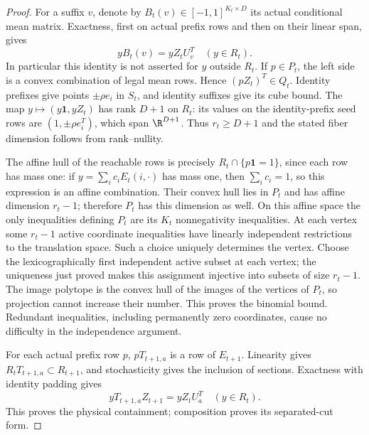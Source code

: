\begin{proof}
For a suffix $v$, denote by $B_t(v)\in[-1,1]^{K_t\times D}$ its
actual conditional mean matrix. Exactness, first on actual prefix rows
and then on their linear span, gives
\begin{equation}\label{eq:span51}
 yB_t(v)=yZ_tU_v^T\quad(y\in R_t).
\end{equation}
In particular this identity is not asserted for $y$ outside $R_t$.
If $p\in P_t$, the left side is a convex combination of legal mean
rows. Hence $(pZ_t)^T\in Q_t$. Identity prefixes give points
$\pm\rho e_i$ in $S_t$, and identity suffixes give its cube bound.
The map $y\mapsto(y\mathbf1,yZ_t)$ has rank $D+1$ on $R_t$:
its values on the identity-prefix seed rows are $(1,\pm\rho e_i^T)$,
which span $\R^{D+1}$. Thus $r_t\ge D+1$ and the stated fiber
dimension follows from rank--nullity.

The affine hull of the reachable rows is precisely
$R_t\cap\{p\mathbf1=1\}$, since each row has mass one: if $y=\sum_i c_iE_t(i,\cdot)$ has
mass one, then $\sum_i c_i=1$, so this expression is an affine combination.
Their convex hull lies in $P_t$ and has affine dimension $r_t-1$;
therefore $P_t$ has this dimension as well. On this affine space the
only inequalities defining $P_t$ are its $K_t$ nonnegativity
inequalities. At each vertex some $r_t-1$ active coordinate
inequalities have linearly independent restrictions to the translation
space. Such a choice uniquely determines the vertex. Choose the lexicographically first independent active subset at each
vertex; the uniqueness just proved makes this assignment injective into
subsets of size $r_t-1$. The image polytope is the convex hull of the
images of the vertices of $P_t$, so projection cannot increase their
number. This proves
the binomial bound. Redundant inequalities, including permanently zero
coordinates, cause no difficulty in the independence argument.

For each actual prefix row $p$, $pT_{t+1,a}$ is a row of $E_{t+1}$.
Linearity gives $R_tT_{t+1,a}\subset R_{t+1}$, and stochasticity gives
the inclusion of sections. Exactness with identity padding gives
\[
 yT_{t+1,a}Z_{t+1}=yZ_tU_a^T\quad(y\in R_t).
\]
This proves the physical containment; composition proves its
separated-cut form.
\end{proof}

